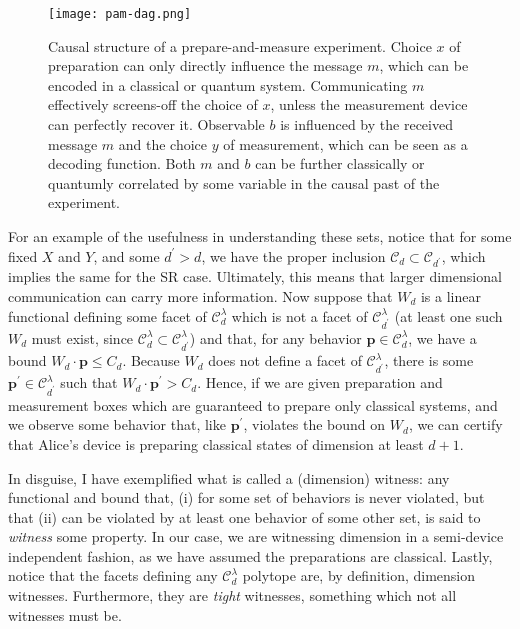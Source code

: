 			\begin{figure}
				\begin{minipage}[c]{0.31\textwidth}
					\centering
					\texttt{[image: pam-dag.png]}
				\end{minipage}
				\begin{minipage}[c]{0.68\textwidth}
					\caption{Causal structure of a prepare-and-measure experiment. Choice $x$ of preparation can only directly influence the message $m$, which can be encoded in a classical or quantum system. Communicating $m$ effectively screens-off the choice of $x$, unless the measurement device can perfectly recover it. Observable $b$ is influenced by the received message $m$ and the choice $y$ of measurement, which can be seen as a decoding function. Both $m$ and $b$ can be further classically or quantumly correlated by some variable in the causal past of the experiment. }	
					\label{fig:pam-dag}
				\end{minipage}
			\end{figure}
            
            For an example of the usefulness in understanding these sets, notice that for some fixed $X$ and $Y$, and some $d^\prime > d$, we have the proper inclusion $\mathcal{C}_{d} \subset \mathcal{C}_{d^\prime}$, which implies the same for the SR case. Ultimately, this means that larger dimensional communication can carry more information. Now suppose that $W_d$ is a linear functional defining some facet of $\mathcal{C}_{d}^\lambda$ which is not a facet of $\mathcal{C}_{d^\prime}^\lambda$ (at least one such $W_d$ must exist, since $\mathcal{C}_{d}^\lambda \subset \mathcal{C}_{d^\prime}^\lambda$) and that, for any behavior $\mathbf{p} \in \mathcal{C}_d^\lambda$, we have a bound $W_d \cdot \mathbf{p} \leq C_d$. Because $W_d$ does not define a facet of $\mathcal{C}_{d^\prime}^\lambda$, there is some $\mathbf{p}^\prime \in \mathcal{C}_{d^\prime}^\lambda$ such that $W_d \cdot \mathbf{p}^\prime > C_d$. Hence, if we are given preparation and measurement boxes which are guaranteed to prepare only classical systems, and we observe some behavior that, like $\mathbf{p}^\prime$, violates the bound on $W_d$, we can certify that Alice's device is preparing classical states of dimension at least $d+1$.
            
            In disguise, I have exemplified what is called a (dimension) witness: any functional and bound that, (i) for some set of behaviors is never violated, but that (ii) can be violated by at least one behavior of some other set, is said to \emph{witness} some property. In our case, we are witnessing dimension in a semi-device independent fashion, as we have assumed the preparations are classical. Lastly, notice that the facets defining any $\mathcal{C}_d^\lambda$ polytope are, by definition, dimension witnesses. Furthermore, they are \emph{tight} witnesses, something which not all witnesses must be.
            
